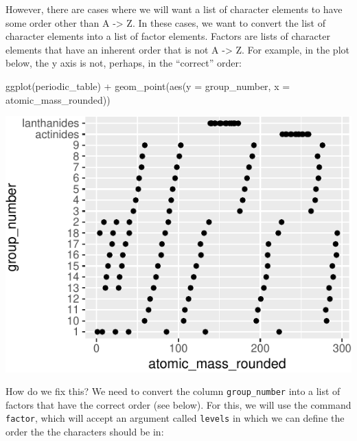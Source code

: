 \documentclass[
]{krantz}
\newenvironment{Shaded}{\begin{snugshade}}{\end{snugshade}}
\newcommand{\AttributeTok}[1]{\textcolor[rgb]{0.77,0.63,0.00}{#1}}
\newcommand{\FunctionTok}[1]{\textcolor[rgb]{0.00,0.00,0.00}{#1}}
\newcommand{\NormalTok}[1]{#1}
\newcommand{\SpecialCharTok}[1]{\textcolor[rgb]{0.00,0.00,0.00}{#1}}
\begin{document}
However, there are cases where we will want a list of character elements to have some order other than A -\textgreater{} Z. In these cases, we want to convert the list of character elements into a list of factor elements. Factors are lists of character elements that have an inherent order that is not A -\textgreater{} Z. For example, in the plot below, the y axis is not, perhaps, in the ``correct'' order:

\begin{Shaded}
\begin{Highlighting}[]
\FunctionTok{ggplot}\NormalTok{(periodic\_table) }\SpecialCharTok{+}
  \FunctionTok{geom\_point}\NormalTok{(}\FunctionTok{aes}\NormalTok{(}\AttributeTok{y =}\NormalTok{ group\_number, }\AttributeTok{x =}\NormalTok{ atomic\_mass\_rounded))}
\end{Highlighting}
\end{Shaded}

\begin{center}\includegraphics{index_files/figure-latex/unnamed-chunk-188-1} \end{center}

How do we fix this? We need to convert the column \texttt{group\_number} into a list of factors that have the correct order (see below). For this, we will use the command \texttt{factor}, which will accept an argument called \texttt{levels} in which we can define the order the the characters should be in:
\end{document}
